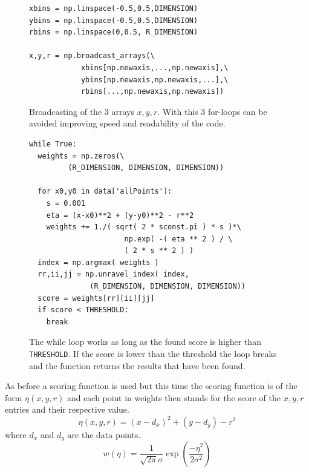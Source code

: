 \documentclass[11pt,twoside]{scrreprt}
\begin{document}
\begin{figure}[htbp]
  \begin{lstlisting}
xbins = np.linspace(-0.5,0.5,DIMENSION)
ybins = np.linspace(-0.5,0.5,DIMENSION)
rbins = np.linspace(0,0.5, R_DIMENSION)

x,y,r = np.broadcast_arrays(\
            xbins[np.newaxis,...,np.newaxis],\
            ybins[np.newaxis,np.newaxis,...],\
            rbins[...,np.newaxis,np.newaxis])
\end{lstlisting}
\caption[3D broadcasting]{Broadcasting of the 3 arrays $x,y,r$. With this 3 for-loops can be avoided improving speed and readability
of the code.}
\label{pc:3D_broadcasting}
\end{figure}

\begin{figure}[htbp]
  \begin{lstlisting}
while True:
  weights = np.zeros(\
         (R_DIMENSION, DIMENSION, DIMENSION))

  for x0,y0 in data['allPoints']:
    s = 0.001
    eta = (x-x0)**2 + (y-y0)**2 - r**2
    weights += 1./( sqrt( 2 * sconst.pi ) * s )*\
                      np.exp( -( eta ** 2 ) / \
                      ( 2 * s ** 2 ) )
  index = np.argmax( weights )
  rr,ii,jj = np.unravel_index( index, 
              (R_DIMENSION, DIMENSION, DIMENSION))
  score = weights[rr][ii][jj]
  if score < THRESHOLD:
    break  
\end{lstlisting}
\caption[Calculation of weights and threshold check for 3D HT]{The while loop works as long as the found score is higher than
\texttt{THRESHOLD}. If the score is lower than the threshold the loop breaks and the function returns the results that have been found.}
\label{pc:3D_threshold}
\end{figure}

As before a scoring function is used but this time the scoring function is of the form $\eta(x,y,r)$ and each point in weights then stands
for the score of the $x,y,r$ entries and their respective value.
\begin{equation}
  \eta(x,y,r) = (x - d_x)^2 + (y - d_y) - r ^ 2
\end{equation}
where $d_x$ and $d_y$ are the data points.
\begin{equation}
  w(\eta) = \frac{1}{\sqrt{2\pi}\sigma}\exp\left( \frac{-\eta^2}{2\sigma^2}\right)
\end{equation}
\end{document}
